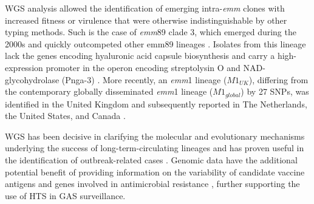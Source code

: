 \ac{WGS} analysis allowed the identiﬁcation of emerging intra-\textit{emm} clones with increased ﬁtness or virulence that were otherwise indistinguishable by other typing methods. Such is the case of \textit{emm}89 clade 3, which emerged during the 2000s and quickly outcompeted other emm89 lineages \cite{friaes_emergence_2015, turner_emergence_2015, zhu_molecular_2015}. Isolates from this lineage lack the genes encoding hyaluronic acid capsule biosynthesis and carry a high-expression promoter in the operon encoding streptolysin O and NAD-glycohydrolase (Pnga-3) \cite{turner_emergence_2015, zhu_trading_2015}. More recently, an \textit{emm}1 lineage ($M1_{UK}$), differing from the contemporary globally disseminated \textit{emm}1 lineage ($M1_{global}$) by 27 \ac{SNPs}, was identiﬁed in the United Kingdom \cite{lynskey_emergence_2019} and subsequently reported in The Netherlands, the United States, and Canada \cite{rumke_dominance_2020, li_m1uk_2020, demczuk_identification_2019}.

\ac{WGS} has been decisive in clarifying the molecular and evolutionary mechanisms underlying the success of long-term-circulating lineages \cite{nasser_evolutionary_2014, beres_molecular_2010} and has proven useful in the identiﬁcation of outbreak-related cases \cite{turner_community_2017, coelho_genomic_2019}. Genomic data have the additional potential beneﬁt of providing information on the variability of candidate vaccine antigens and genes involved in antimicrobial resistance \cite{davies_atlas_2019, beres_integrative_2022}, further supporting the use of \ac{HTS} in \ac{GAS} surveillance.

